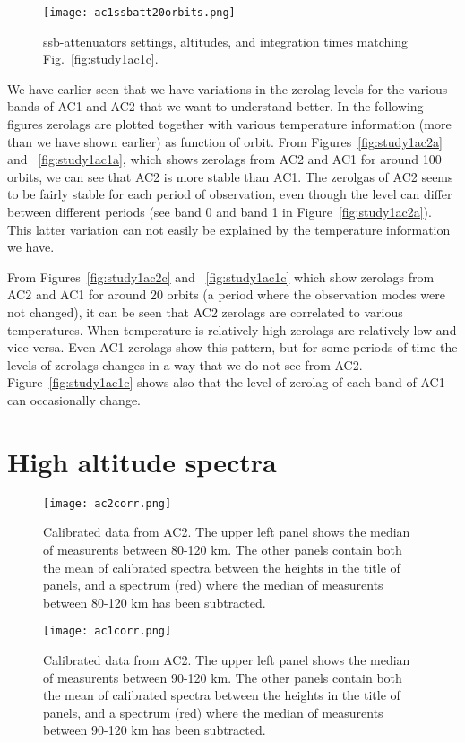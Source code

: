 \begin{figure}[!t]
\centering
\texttt{[image: ac1ssbatt20orbits.png]}
\caption{ssb-attenuators settings, altitudes, and integration times
matching Fig.~\ref{fig:study1ac1c}.}
\label{fig:study1ac1d}
\end{figure}

We have earlier seen that we have variations in the zerolag
levels for the various bands of AC1 and AC2 that we want to
understand better. In the following figures zerolags
are plotted together with various temperature information
(more than we have shown earlier)
as function of orbit.
From Figures~\ref{fig:study1ac2a} and ~\ref{fig:study1ac1a},
which shows zerolags from AC2 and AC1 for around 100 orbits,
we can see that AC2 is more stable than AC1. 
The zerolgas of AC2 seems to be fairly stable for each period
of observation, even though the level can differ between different
periods (see band 0 and band 1 in Figure~\ref{fig:study1ac2a}).
This latter variation can not easily be explained by the temperature
information we have.

From Figures~\ref{fig:study1ac2c} and ~\ref{fig:study1ac1c}
which show zerolags from AC2 and AC1 for around 20 orbits
(a period where the observation modes were not changed),
it can be seen that AC2 zerolags are correlated to various
temperatures. When temperature is relatively high zerolags are
relatively low and vice versa.
Even AC1 zerolags show this pattern, but for some periods of time
the levels of zerolags changes in a way that we do not see from AC2.
Figure~\ref{fig:study1ac1c} shows also that the level of zerolag of each band 
of AC1 can occasionally change. 

\clearpage
\newpage
\section{High altitude spectra}
\begin{figure}[!t]
\centering
\texttt{[image: ac2corr.png]}
\caption{Calibrated data from AC2. The upper left panel shows
the median of measurents between 80-120 km. The other panels contain
both the mean of calibrated spectra between the heights in the title
of panels, and a spectrum (red) where the median of measurents between 80-120 km
has been subtracted. }
\label{fig:study1ac2corr}
\end{figure}


\begin{figure}[!t]
\centering
\texttt{[image: ac1corr.png]}
\caption{Calibrated data from AC2. The upper left panel shows
the median of measurents between 90-120 km. The other panels contain
both the mean of calibrated spectra between the heights in the title
of panels, and a spectrum (red) where the median of measurents between 90-120 km
has been subtracted.}
\label{fig:study1ac1corr}
\end{figure}
    
